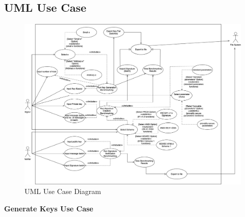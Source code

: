\documentclass[]{final_report}
\theoremstyle{definition}
\begin{document}
\begin{enumerate}
\end{enumerate}

\subsection{UML Use Case}
\begin{figure}[H]
    \centering
    \includegraphics[scale=0.38]{poc_pictures/MAIN_USE-CASE.png}
    \caption{UML Use Case Diagram}
    \label{fig:uc}
\end{figure}



\textbf{Generate Keys Use Case}
\end{document}
